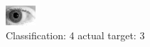 \begin{figure}[h!]
\begin{center}
\includegraphics[width=0.60\columnwidth]{figures/ID298_class_4_target_3.png}
\end{center}
\caption{ Classification: 4 actual target: 3}
\label{fig:ID298_class_4_target_3}
\end{figure}
